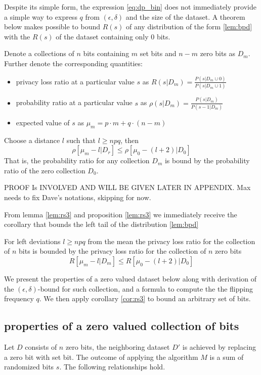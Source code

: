\documentclass[11pt]{article}
\begin{document}
Despite its simple form, the expression \ref{eq:dp_bin} does not immediately provide a simple way to express $q$ from  $(\epsilon,\delta)$ and the size of the dataset.  A theorem below makes possible to bound $R(s)$ of any distribution of the form  \ref{lem:bpd} with the $R(s)$ of the dataset containing only 0 bits.

\begin{prop} \label{lem:rs3}
Denote a collections of $n$ bits containing $m$ set bits and $n-m$ zero bits as $D_m$. Further denote the corresponding quantities:
\begin{itemize}
\item privacy loss ratio at a particular value $s$ as $R(s|D_m) = \frac{P(s|D_m \cup 0)}{P(s | D_m \cup 1)}$
\item probability ratio at a particular value $s$ as $\rho(s|D_m) = \frac{P(s|D_m)}{P(s-1|D_m)}$
\item expected value of $s$ as $\mu_m = p \cdot m + q \cdot (n-m )$
\end{itemize}
Choose a distance $l$ such that $l \ge npq$, then 
\[ \rho[\mu_m - l|D_r] \le \rho[\mu_0 - (l+2)|D_0] \]
That is, the probability ratio for any collection $D_m$ is bound by the probability ratio of the zero collection $D_0$. 
\begin{pf}
PROOF Is INVOLVED AND WILL BE GIVEN LATER IN APPENDIX.  Max needs to fix Dave's notations, skipping for now.
\end{pf}
\end{prop}

From lemma \eqref{lem:rs3} and proposition \ref{lem:rs3} we immediately receive the corollary that bounds the left tail of the distribution \ref{lem:bpd}
\begin{cor}\label{cor:rs3}
For left deviations $l \ge npq$ from the mean the privacy loss ratio for the collection of $n$ bits is bounded by the privacy loss ratio for the collection of $n$ zero bits
\[ R[\mu_m- l|D_m] \le R[\mu_0 - (l+2)|D_0] \]
\end{cor}


We present the properties of a zero valued dataset below along with derivation of the $(\epsilon,\delta)$-bound for such collection, and a formula  to compute the the flipping frequency $q$. We then apply corollary \ref{cor:rs3} to bound an arbitrary set of bits. 

\subsection{properties of a zero valued collection of bits}
Let $D$ consists of $n$ zero bits, the neighboring dataset $D'$ is achieved by replacing a zero bit with set bit. The outcome of applying the algorithm $M$ is a sum of randomized bits $s$. The following relationships hold.
\end{document}
